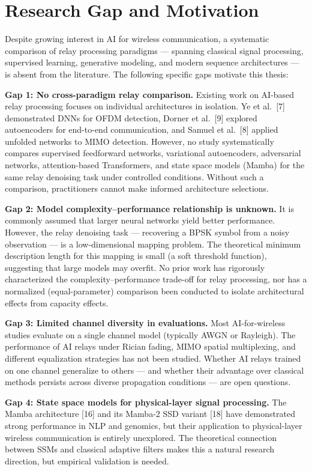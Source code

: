 \section{Research Gap and Motivation}\label{sec:research-gap-and-motivation}

Despite growing interest in AI for wireless communication, a systematic comparison of relay processing paradigms --- spanning classical signal processing, supervised learning, generative modeling, and modern sequence architectures --- is absent from the literature. The following specific gaps motivate this thesis:

\textbf{Gap 1: No cross-paradigm relay comparison.} Existing work on AI-based relay processing focuses on individual architectures in isolation. Ye et al.~{[}7{]} demonstrated DNNs for OFDM detection, Dorner et al.~{[}9{]} explored autoencoders for end-to-end communication, and Samuel et al.~{[}8{]} applied unfolded networks to MIMO detection. However, no study systematically compares supervised feedforward networks, variational autoencoders, adversarial networks, attention-based Transformers, and state space models (Mamba) for the same relay denoising task under controlled conditions. Without such a comparison, practitioners cannot make informed architecture selections.

\textbf{Gap 2: Model complexity--performance relationship is unknown.} It is commonly assumed that larger neural networks yield better performance. However, the relay denoising task --- recovering a BPSK symbol from a noisy observation --- is a low-dimensional mapping problem. The theoretical minimum description length for this mapping is small (a soft threshold function), suggesting that large models may overfit. No prior work has rigorously characterized the complexity--performance trade-off for relay processing, nor has a normalized (equal-parameter) comparison been conducted to isolate architectural effects from capacity effects.

\textbf{Gap 3: Limited channel diversity in evaluations.} Most AI-for-wireless studies evaluate on a single channel model (typically AWGN or Rayleigh). The performance of AI relays under Rician fading, MIMO spatial multiplexing, and different equalization strategies has not been studied. Whether AI relays trained on one channel generalize to others --- and whether their advantage over classical methods persists across diverse propagation conditions --- are open questions.

\textbf{Gap 4: State space models for physical-layer signal processing.} The Mamba architecture {[}16{]} and its Mamba-2 SSD variant {[}18{]} have demonstrated strong performance in NLP and genomics, but their application to physical-layer wireless communication is entirely unexplored. The theoretical connection between SSMs and classical adaptive filters makes this a natural research direction, but empirical validation is needed.


